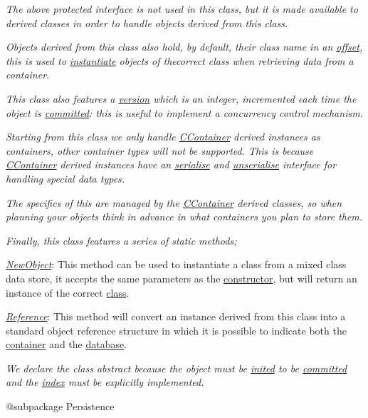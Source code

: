 {\itshape The above protected interface is not used in this class, but it is made available to derived classes in order to handle objects derived from this class.}

{\itshape Objects derived from this class also hold, by default, their class name in an \hyperlink{}{offset}, this is used to \hyperlink{}{instantiate} objects of thecorrect class when retrieving data from a container.}

{\itshape This class also features a \hyperlink{}{version} which is an integer, incremented each time the object is \hyperlink{}{committed}\-: this is useful to implement a concurrency control mechanism.}

{\itshape Starting from this class we only handle \hyperlink{class_c_container}{C\-Container} derived instances as containers, other container types will not be supported. This is because \hyperlink{class_c_container}{C\-Container} derived instances have an \hyperlink{class_c_data_type_a608d6fc184bce537ce83669f729d6008}{serialise} and \hyperlink{}{unserialise} interface for handling special data types.}

{\itshape The specifics of this are managed by the \hyperlink{class_c_container}{C\-Container} derived classes, so when planning your objects think in advance in what containers you plan to store them.}

{\itshape Finally, this class features a series of static methods;}

{\itshape 
\begin{DoxyItemize}
\item {\itshape \hyperlink{}{New\-Object}}\-: This method can be used to instantiate a class from a mixed class data store, it accepts the same parameters as the \hyperlink{}{constructor}, but will return an instance of the correct \hyperlink{}{class}. 
\item {\itshape \hyperlink{}{Reference}}\-: This method will convert an instance derived from this class into a standard object reference structure in which it is possible to indicate both the \hyperlink{}{container} and the \hyperlink{}{database}. 
\end{DoxyItemize}}

{\itshape We declare the class abstract because the object must be \hyperlink{}{inited} to be \hyperlink{}{committed} and the \hyperlink{}{index} must be explicitly implemented.}

{\itshape \begin{DoxyVerb} @subpackage        Persistence\end{DoxyVerb}
}


